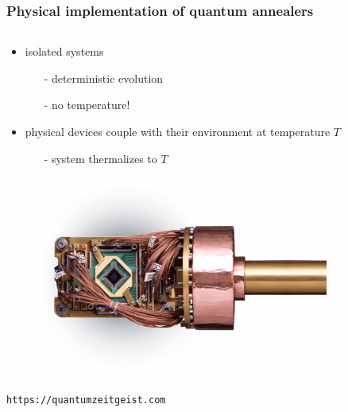 \documentclass[11pt]{beamer}
\newcommand{\itemb}{\item[$\bullet$]}
\begin{document}
\begin{frame}
    \frametitle{Physical implementation of quantum annealers}    
    \begin{columns}[T]
        \begin{column}{0.5\textwidth}
            \begin{itemize}
                \itemb isolated systems
                \begin{itemize}
                    \item [-] deterministic evolution
                    \item [-] no temperature!
                \end{itemize}
                \vspace*{0.3cm} 
                \itemb physical devices couple with their environment at temperature $T$
                \begin{itemize}
                    \item [-] system thermalizes to $T$
                \end{itemize}
            \end{itemize}
            \begin{figure}
                \vspace*{-1em}
                \includegraphics[width=0.9\textwidth]{../plots/dwave-chip.png}
            \end{figure}
            \vspace*{-3em}
            {\tiny \hspace*{2.2em} \texttt{https://quantumzeitgeist.com}}
        \end{column}
        \begin{column}{0.5\textwidth}
            \begin{itemize}

\end{itemize}
\end{column}
\end{columns}
\end{frame}
\end{document}
